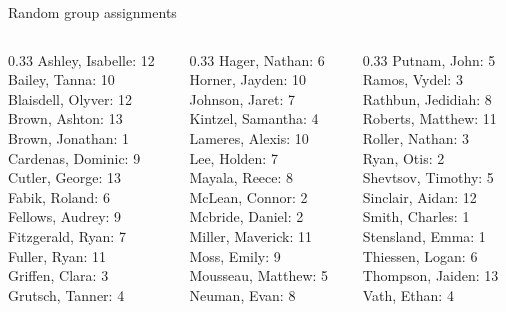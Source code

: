 \documentclass[10pt]{beamer}
\begin{document}
\begin{frame}{Random group assignments}
\begin{columns}
\begin{column}{0.33\textwidth}
Ashley, Isabelle: 12 \\ 
Bailey, Tanna: 10 \\ 
Blaisdell, Olyver: 12 \\ 
Brown, Ashton: 13 \\ 
Brown, Jonathan: 1 \\ 
Cardenas, Dominic: 9 \\ 
Cutler, George: 13 \\ 
Fabik, Roland: 6 \\ 
Fellows, Audrey: 9 \\ 
Fitzgerald, Ryan: 7 \\ 
Fuller, Ryan: 11 \\ 
Griffen, Clara: 3 \\ 
Grutsch, Tanner: 4 \\\end{column}
\begin{column}{0.33\textwidth}
Hager, Nathan: 6 \\ 
Horner, Jayden: 10 \\ 
Johnson, Jaret: 7 \\ 
Kintzel, Samantha: 4 \\ 
Lameres, Alexis: 10 \\ 
Lee, Holden: 7 \\ 
Mayala, Reece: 8 \\ 
McLean, Connor: 2 \\ 
Mcbride, Daniel: 2 \\ 
Miller, Maverick: 11 \\ 
Moss, Emily: 9 \\ 
Mousseau, Matthew: 5 \\ 
Neuman, Evan: 8 \\\end{column}
\begin{column}{0.33\textwidth}
Putnam, John: 5 \\ 
Ramos, Vydel: 3 \\ 
Rathbun, Jedidiah: 8 \\ 
Roberts, Matthew: 11 \\ 
Roller, Nathan: 3 \\ 
Ryan, Otis: 2 \\ 
Shevtsov, Timothy: 5 \\ 
Sinclair, Aidan: 12 \\ 
Smith, Charles: 1 \\ 
Stensland, Emma: 1 \\ 
Thiessen, Logan: 6 \\ 
Thompson, Jaiden: 13 \\ 
Vath, Ethan: 4 \\\end{column}
\end{columns}

\end{frame}
\end{document}
